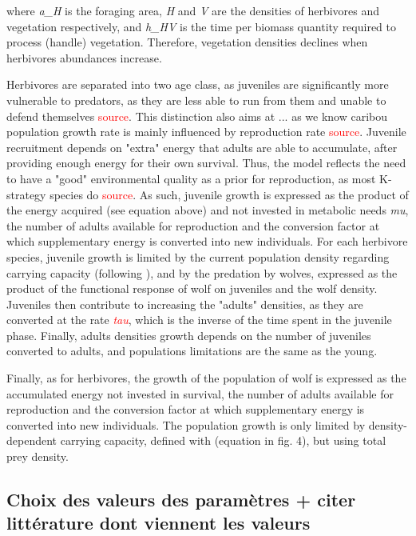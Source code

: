 where \emph{a_H} is the foraging area, \emph{H} and \emph{V} are the densities of herbivores and vegetation respectively, and \emph{h_{HV}} is the time per biomass quantity required to process (handle) vegetation. Therefore, vegetation densities declines when herbivores abundances increase. 


Herbivores are separated into two age class, as juveniles are significantly more vulnerable to predators, as they are less able to run from them and unable to defend themselves \textcolor{red}{source}. This distinction also aims at ... as we know caribou population growth rate is mainly influenced by reproduction rate \textcolor{red}{source}. Juvenile recruitment depends on "extra" energy that adults are able to accumulate, after providing enough energy for their own survival. Thus, the model reflects the need to have a "good" environmental quality as a prior for reproduction, as most K-strategy species do \textcolor{red}{source}. As such, juvenile growth is expressed as the product of the energy acquired (see equation above) and not invested in metabolic needs \emph{mu}, the number of adults available for reproduction and the conversion factor at which supplementary energy is converted into new individuals. For each herbivore species, juvenile growth is limited by the current population density regarding carrying capacity (following \cite{turchin2003}), and by the predation by wolves, expressed as the product of the functional response of wolf on juveniles and the wolf density. Juveniles then contribute to increasing the "adults" densities, as they are converted at the rate \textcolor{red}{\emph{tau}}, which is the inverse of the time spent in the juvenile phase. Finally, adults densities growth depends on the number of juveniles converted to adults, and populations limitations are the same as the young. 

Finally, as for herbivores, the growth of the population of wolf is expressed as the accumulated energy not invested in survival, the number of adults available for reproduction and the conversion factor at which supplementary energy is converted into new individuals. The population growth is only limited by density-dependent carrying capacity, defined with \cite{messier1994} (equation in fig. 4), but using total prey density. 


\subsection{Choix des valeurs des paramètres + citer littérature dont viennent les valeurs}


